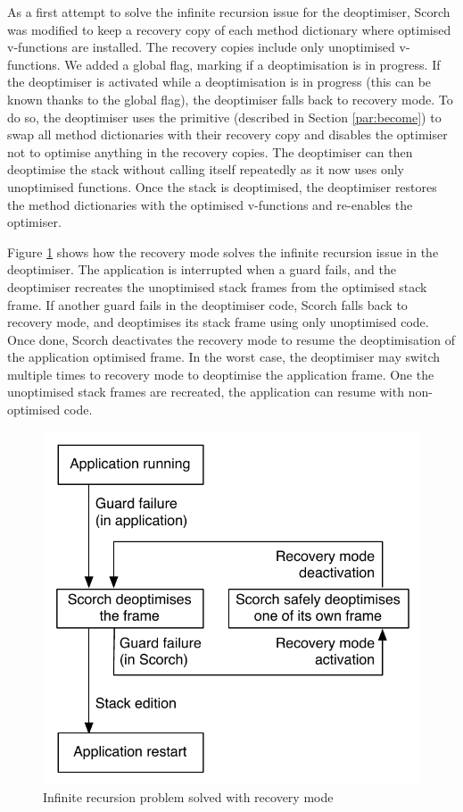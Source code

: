 \documentclass[a4paper,12pt,twoside]{../includes/ThesisStyle}
\begin{document}
As a first attempt to solve the infinite recursion issue for the deoptimiser, Scorch was modified to keep a recovery copy of each method dictionary where optimised v-functions are installed. The recovery copies include only unoptimised v-functions. We added a global flag, marking if a deoptimisation is in progress. If the deoptimiser is activated while a deoptimisation is in progress (this can be known thanks to the global flag), the deoptimiser falls back to recovery mode. To do so, the deoptimiser uses the primitive  (described in Section \ref{par:become}) to swap all method dictionaries with their recovery copy and disables the optimiser not to optimise anything in the recovery copies. The deoptimiser can then deoptimise the stack without calling itself repeatedly as it now uses only unoptimised functions. Once the stack is deoptimised, the deoptimiser restores the method dictionaries with the optimised v-functions and re-enables the optimiser. 

Figure \ref{fig:InfiniteRecursionDeoptPbRecovery} shows how the recovery mode solves the infinite recursion issue in the deoptimiser. The application is interrupted when a guard fails, and the deoptimiser recreates the unoptimised stack frames from the optimised stack frame. If another guard fails in the deoptimiser code, Scorch falls back to recovery mode, and deoptimises its stack frame using only unoptimised code. Once done, Scorch deactivates the recovery mode to resume the deoptimisation of the application optimised frame. In the worst case, the deoptimiser may switch multiple times to recovery mode to deoptimise the application frame. One the unoptimised stack frames are recreated, the application can resume with non-optimised code.

\begin{figure}[h!]
    \begin{center}
        \includegraphics[width=0.6\linewidth]{InfiniteRecursionDeoptPbRecovery}
        \caption{Infinite recursion problem solved with recovery mode}
        \label{fig:InfiniteRecursionDeoptPbRecovery}
    \end{center}
\end{figure}
\end{document}
